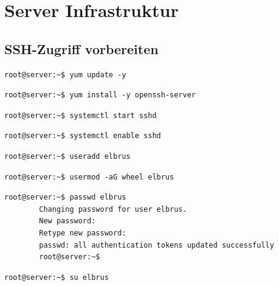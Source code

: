 \documentclass{article}
\begin{document}
	\section[Server Infrastruktur]{Server Infrastruktur}
	\subsection{SSH-Zugriff vorbereiten}
	
	\lstset{style=commands}
	\begin{lstlisting}[caption={Updaten vorhandener Packages.}]
		root@server:~$ yum update -y
	\end{lstlisting}
	
	\lstset{style=commands}
	\begin{lstlisting}[caption={Installieren des 'ssh' Packages.}]
		root@server:~$ yum install -y openssh-server
	\end{lstlisting}

	\lstset{style=commands}
	\begin{lstlisting}[caption={Starten des 'sshd' Services.}]
		root@server:~$ systemctl start sshd
	\end{lstlisting}

	\lstset{style=commands}
	\begin{lstlisting}[caption={Aktivieren des 'sshd' Services.}]
		root@server:~$ systemctl enable sshd
	\end{lstlisting}

	\lstset{style=commands}
	\begin{lstlisting}[caption={Anlegen des Users Elbrus.}]
		root@server:~$ useradd elbrus
	\end{lstlisting}

	\lstset{style=commands}
	\begin{lstlisting}[caption={Hinzufügen des Users Elbrus zu der Gruppe 'wheel'.}]
		root@server:~$ usermod -aG wheel elbrus
	\end{lstlisting}
	\newpage
	
	\lstset{style=commands}
	\begin{lstlisting}[caption={Ändern des Passwords für den User Elbrus.}]
		root@server:~$ passwd elbrus
		Changing password for user elbrus.
		New password:
		Retype new password:
		passwd: all authentication tokens updated successfully
		root@server:~$
	\end{lstlisting}

	\lstset{style=commands}
	\begin{lstlisting}[caption={Wechseln zu User elbrus.}]
		root@server:~$ su elbrus
	\end{lstlisting}
	
\end{document}
